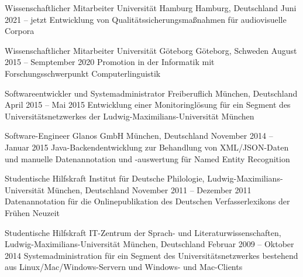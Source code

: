 \documentclass[11pt, a4]{academic-cv}
\begin{document}
\begin{cventries}
\cventry
{Wissenschaftlicher Mitarbeiter} %
{ Universität Hamburg} %
{Hamburg, Deutschland} %
{Juni 2021 -- jetzt} %
{
Entwicklung von Qualitätssicherungsmaßnahmen für audiovisuelle Corpora
}

\cventry
{Wissenschaftlicher Mitarbeiter} %
{ Universität Göteborg} %
{Göteborg, Schweden} %
{August 2015 -- Semptember 2020} %
{
Promotion in der Informatik mit Forschungsschwerpunkt Computerlinguistik
}

\cventry
{Softwareentwickler und Systemadministrator} %
{Freiberuflich} %
{München, Deutschland} %
{April 2015 -- Mai 2015} %
{
Entwicklung einer Monitoringlösung für ein Segment des Universitätsnetzwerkes der Ludwig-Maximilians-Universität München
}

\cventry
{Software-Engineer} %
{ Glanos GmbH} %
{München, Deutschland} %
{November 2014 -- Januar 2015} %
{
Java-Backendentwicklung zur Behandlung von XML/JSON-Daten und manuelle Datenannotation und -auswertung für Named Entity Recognition
}

\cventry
{Studentische Hilfskraft} %
{ Institut für Deutsche Philologie, Ludwig-Maximilians-Universität} %
{München, Deutschland} %
{November 2011 -- Dezember 2011} %
{
Datenannotation für die Onlinepublikation des Deutschen Verfasserlexikons der Frühen Neuzeit
}

\cventry
{Studentische Hilfskraft} %
{ IT-Zentrum der Sprach- und Literaturwissenschaften, Ludwig-Maximilians-Universität} %
{München, Deutschland} %
{Februar 2009 -- Oktober 2014} %
{
Systemadministration für ein Segment des Universitätsnetzwerkes bestehend aus Linux/Mac/Windows-Servern und Windows- und Mac-Clients
}

\end{cventries}
\vspace{-10px}
\end{document}
